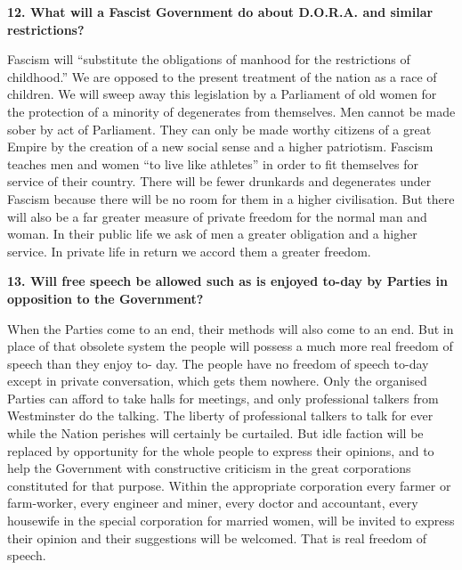 \documentclass{book}
\begin{document}
\begin{flushleft}
\textbf{12. What will a Fascist Government do about D.O.R.A. and similar restrictions?}

Fascism will ``substitute the obligations of manhood for the restrictions of childhood.'' We are
opposed to the present treatment of the nation as a race of children. We will sweep away this
legislation by a Parliament of old women for the protection of a minority of degenerates from
themselves. Men cannot be made sober by act of Parliament. They can only be made worthy
citizens of a great Empire by the creation of a new social sense and a higher patriotism. Fascism
teaches men and women ``to live like athletes'' in order to fit themselves for service of their
country. There will be fewer drunkards and degenerates under Fascism because there will be no
room for them in a higher civilisation. But there will also be a far greater measure of private
freedom for the normal man and woman. In their public life we ask of men a greater obligation and a higher service. In private life in return
we accord them a greater freedom.
\end{flushleft}
\begin{flushright}
\textbf{13. Will free speech be allowed such as is enjoyed to-day
    by Parties in opposition to the Government?}

When the Parties come to an end, their methods will also come to an end. But in place of that
obsolete system the people will possess a much more real freedom of speech than they enjoy to-
day. The people have no freedom of speech to-day except in private conversation, which gets
them nowhere. Only the organised Parties can afford to take halls for meetings, and only
professional talkers from Westminster do the talking. The liberty of professional talkers to talk
for ever while the Nation perishes will certainly be curtailed. But idle faction will be replaced by
opportunity for the whole people to express their opinions, and to help the Government with
constructive criticism in the great corporations constituted for that purpose. Within the
appropriate corporation every farmer or farm-worker, every engineer and miner, every doctor
and accountant, every housewife in the special corporation for married women, will be invited to
express their opinion and their suggestions will be welcomed. That is real freedom of speech.
\end{flushright}
\end{document}
